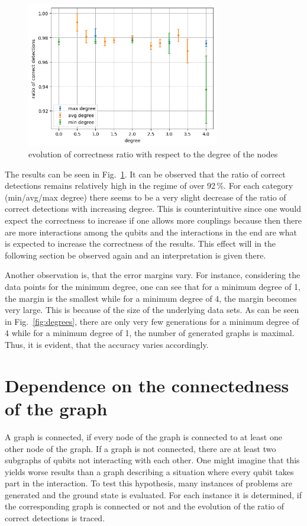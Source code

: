 \documentclass{article}
\begin{document}
	\begin{figure}[h]
		\centering
		\includegraphics[width=0.75\textwidth]{img/deg_ratio.png}
		\caption{evolution of correctness ratio with respect to the degree of the nodes}
		\label{fig:correctness degree}
	\end{figure}
	The results can be seen in Fig.~\ref{fig:correctness degree}. It can be observed that the ratio of correct detections remains relatively high in the regime of over 92\,\%. For each category (min/avg/max degree) there seems to be a very slight decrease of the ratio of correct detections with increasing degree. This is counterintuitive since one would expect the correctness to increase if one allows more couplings because then there are more interactions among the qubits and the interactions in the end are what is expected to increase the correctness of the results. This effect will in the following section be observed again and an interpretation is given there. 
	
	Another observation is, that the error margins vary. For instance, considering the data points for the minimum degree, one can see that for a minimum degree of 1, the margin is the smallest while for a minimum degree of 4, the margin becomes very large. This is because of the size of the underlying data sets. As can be seen in Fig.~\ref{fig:degrees}, there are only very few generations for a minimum degree of 4 while for a minimum degree of 1, the number of generated graphs is maximal. Thus, it is evident, that the accuracy varies accordingly.   
	
	\section{Dependence on the connectedness of the graph}\label{sec:dependence on the connectedness of the graph}
	A graph is connected, if every node of the graph is connected to at least one other node of the graph. If a graph is not connected, there are at least two subgraphs of qubits not interacting with each other. One might imagine that this yields worse results than a graph describing a situation where every qubit takes part in the interaction. To test this hypothesis, many instances of problems are generated and the ground state is evaluated. For each instance it is determined, if the corresponding graph is connected or not and the evolution of the ratio of correct detections is traced. 
	
\end{document}
